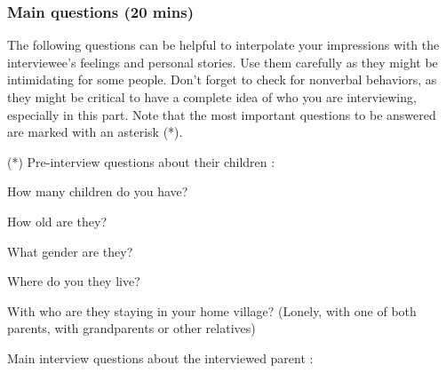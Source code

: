 \vspace{2pt}
\subsubsection{Main questions (20 mins)}

The following questions can be helpful to interpolate your impressions with the interviewee’s feelings and personal stories. Use them carefully as they might be intimidating for some people. Don’t forget to check for nonverbal behaviors, as they might be critical to have a complete idea of who you are interviewing, especially in this part. Note that the most important questions to be answered are marked with an asterisk (*).

\vspace{2pt}
(*) Pre-interview questions about their children :

\begin{todolist}
    \item How many children do you have?
    \item How old are they?
    \item What gender are they?
    \item Where do you they live?
    \item With who are they staying in your home village? (Lonely, with one of both parents, with grandparents or other relatives)
\end{todolist}

Main interview questions about the interviewed parent :

